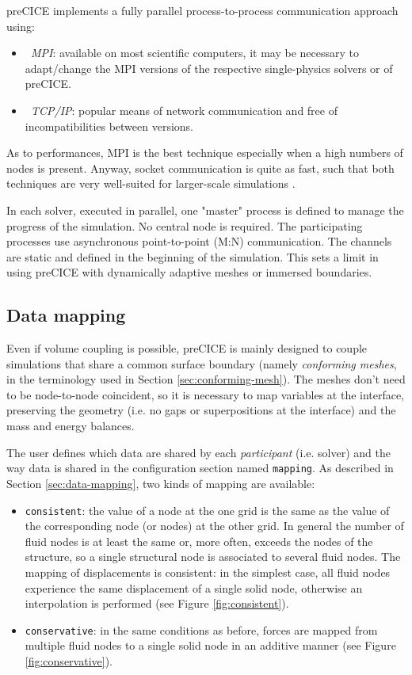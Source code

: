 preCICE implements a fully parallel process-to-process communication approach \cite{Shukaev2015} using:

\begin{itemize}
	\item \textit{~\ac{MPI}}: available on 	most scientific computers, it may be necessary to adapt/change the MPI versions of the respective single-physics solvers or of preCICE.
	\item \textit{~\ac{TCP/IP}}: popular means of network communication and free of incompatibilities between versions.
\end{itemize}

As to performances, MPI is the best technique especially when a high numbers of nodes is present. Anyway, socket communication is quite as fast, such that
both techniques are very well-suited for larger-scale simulations \cite{gatzhammer2014efficient}.

In each solver, executed in parallel, one "master" process is defined to manage the progress of the simulation. No central node is required. The participating
processes use asynchronous point-to-point (M:N) communication. The channels are static and defined in the beginning of the simulation. This sets a limit in using preCICE with dynamically adaptive meshes or immersed boundaries.

\subsection{Data mapping}
\label{sec:pc-map}

Even if volume coupling is possible, preCICE is mainly designed to couple simulations that share a common surface boundary (namely \textit{conforming meshes}, in the terminology used in Section \ref{sec:conforming-mesh}). The meshes don't need to be node-to-node coincident, so it is necessary to map variables at the interface, preserving the geometry (i.e. no gaps or superpositions at the interface) and the mass and energy balances. 

The user defines which data are shared by each \textit{participant} (i.e. solver) and the way data is shared in the configuration section named \texttt{mapping}. As described in Section \ref{sec:data-mapping}, two kinds of mapping are available:

\begin{itemize}
	\item \texttt{consistent}: the value of a node at the one grid is the same as the value of the corresponding node (or nodes) at the other grid. In general the number of fluid nodes is at least the same or, more often, exceeds the nodes of the structure, so a single structural node is associated to several fluid nodes. The mapping of displacements is consistent: in the simplest case, all fluid nodes experience the same displacement of a single solid node, otherwise an interpolation is performed (see Figure \ref{fig:consistent}).
	\item \texttt{conservative}: in the same conditions as before, forces are mapped from multiple fluid nodes to a single solid node in an additive manner (see Figure \ref{fig:conservative}).
\end{itemize} 

